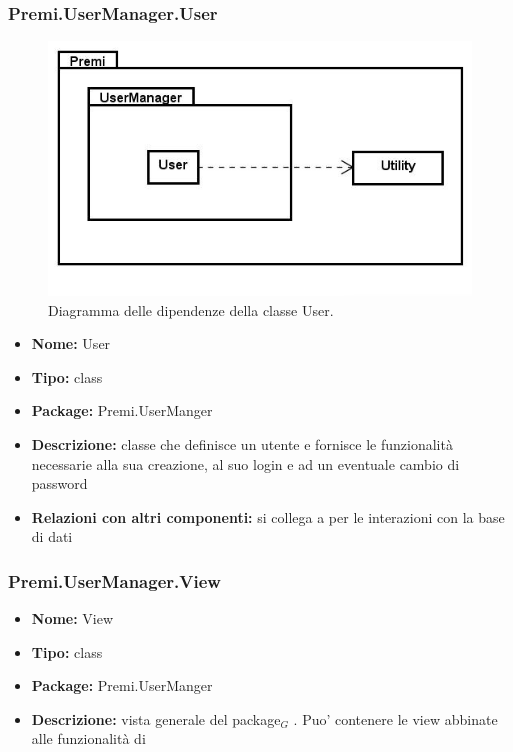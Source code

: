 \subsubsection{Premi.UserManager.User}
\begin{figure}[h]
\begin{center}
\includegraphics[scale=0.45]{img/diapkg/Utility_UserManager.jpg}
\caption{Diagramma delle dipendenze della classe User.}
\end{center}
\end{figure}
\begin{itemize}
  \item \textbf{Nome:} User
  \item \textbf{Tipo:} class
  \item \textbf{Package:} Premi.UserManger
  \item \textbf{Descrizione:} classe che definisce un utente e fornisce le funzionalità necessarie alla sua creazione, al suo login e ad un eventuale cambio di password
  \item \textbf{Relazioni con altri componenti:} si collega a  per le interazioni con la base di dati
\end{itemize}

\subsubsection{Premi.UserManager.View}
\begin{itemize}
  \item \textbf{Nome:} View
  \item \textbf{Tipo:} class
  \item \textbf{Package:} Premi.UserManger
  \item \textbf{Descrizione:} vista generale del package$_G$ . Puo' contenere le view abbinate alle funzionalità di 
\end{itemize}
